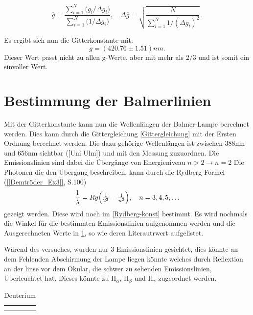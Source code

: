\begin{equation}
  \overline{g}
  = \frac{\sum_{i=1}^{N} \bigl(g_i/\Delta g_i\bigr)}
         {\sum_{i=1}^{N} \bigl(1/\Delta g_i\bigr)},
  \quad
  \Delta\overline{g}
  = \sqrt{\frac{N}{\sum_{i=1}^{N} 1/(\Delta g_i)^{2}}}\,.
\end{equation}

Es ergibt sich nun die Gitterkonstante mit:
\begin{equation}
    \overline{g} = (420.76 \pm 1.51) nm.
    \label{gitterkon}
\end{equation}
Dieser Wert passt nicht zu allen g-Werte, aber mit mehr als $2/3$ und ist somit ein sinvoller Wert. 

\section{Bestimmung der Balmerlinien}

Mit der Gitterkonstante kann nun die Wellenlängen der Balmer-Lampe berechnet werden. 
Dies kann durch die Gittergleichung \ref{Gittergleichung} mit der Ersten Ordnung berechnet werden.
Die dazu gehörige Wellenlängen ist zwischen 388nm und 656nm sichtbar ([Uni Ulm]) und mit den Messung zuzuordnen.
Die Emissionslinien sind dabei die Übergänge von Energieniveau $n > 2 \xrightarrow{} n = 2$ 
Die Photonen die den Übergang beschreiben, kann durch die Rydberg-Formel (\cref{[Demtröder_Ex3]}, S.100) 
\begin{equation}
  \frac{1}{\lambda}
  = Ry\Bigl(\tfrac{1}{2^{2}} - \tfrac{1}{n^{2}}\Bigr),
  \quad n=3,4,5,\dots
  \label{Rydberg-Formel}
\end{equation}
gezeigt werden.
Diese wird noch im \cref{Rydberg-konst} bestimmt. 
Es wird nochmals die Winkel für die bestimmten Emissionslinien aufgenommen werden und die Ausgerechneten Werte in \cref{tab: gesehenes deut}, so wie deren Literautrwert aufgelistet. 

Wärend des versuches, wurden nur 3 Emissionslinien gesichtet, dies könnte an dem Fehlenden Abschirmung der Lampe liegen könnte welches durch Reflextion an der linse vor dem Okular, die schwer zu sehenden Emissionslinien, Überleuchtet hat. %
Dieses könnte zu H$_\alpha$, H$_\beta$ und H$_\gamma$ zugeordnet werden.

\begin{table}[htbp]
    \centering
    \begin{tabular}{c|c}
         &  \\
         & 
    \end{tabular}
    \caption{Deuterium}
    \label{tab: gesehenes deut}
\end{table}

